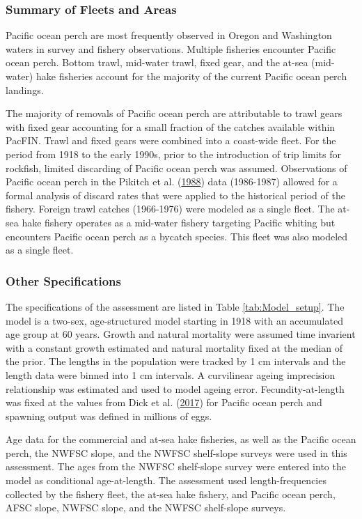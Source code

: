 \documentclass[12pt,]{article}
\begin{document}
\subsubsection{Summary of Fleets and
Areas}\label{summary-of-fleets-and-areas}

Pacific ocean perch are most frequently observed in Oregon and
Washington waters in survey and fishery observations. Multiple fisheries
encounter Pacific ocean perch. Bottom trawl, mid-water trawl, fixed
gear, and the at-sea (mid-water) hake fisheries account for the majority
of the current Pacific ocean perch landings.

The majority of removals of Pacific ocean perch are attributable to
trawl gears with fixed gear accounting for a small fraction of the
catches available within PacFIN. Trawl and fixed gears were combined
into a coast-wide fleet. For the period from 1918 to the early 1990s,
prior to the introduction of trip limits for rockfish, limited
discarding of Pacific ocean perch was assumed. Observations of Pacific
ocean perch in the Pikitch et al.
(\protect\hyperlink{ref-pikitch_evaluation_1988}{1988}) data (1986-1987)
allowed for a formal analysis of discard rates that were applied to the
historical period of the fishery. Foreign trawl catches (1966-1976) were
modeled as a single fleet. The at-sea hake fishery operates as a
mid-water fishery targeting Pacific whiting but encounters Pacific ocean
perch as a bycatch species. This fleet was also modeled as a single
fleet.

\subsubsection{Other Specifications}\label{other-specifications}

The specifications of the assessment are listed in Table
\ref{tab:Model_setup}. The model is a two-sex, age-structured model
starting in 1918 with an accumulated age group at 60 years. Growth and
natural mortality were assumed time invarient with a constant growth
estimated and natural mortality fixed at the median of the prior. The
lengths in the population were tracked by 1 cm intervals and the length
data were binned into 1 cm intervals. A curvilinear ageing imprecision
relationship was estimated and used to model ageing error.
Fecundity-at-length was fixed at the values from Dick et al.
(\protect\hyperlink{ref-dick_meta-analysis_2017}{2017}) for Pacific
ocean perch and spawning output was defined in millions of eggs.

Age data for the commercial and at-sea hake fisheries, as well as the
Pacific ocean perch, the NWFSC slope, and the NWFSC shelf-slope surveys
were used in this assessment. The ages from the NWFSC shelf-slope survey
were entered into the model as conditional age-at-length. The assessment
used length-frequencies collected by the fishery fleet, the at-sea hake
fishery, and Pacific ocean perch, AFSC slope, NWFSC slope, and the NWFSC
shelf-slope surveys.
\end{document}
